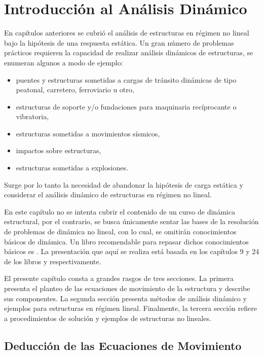 \chapter{Introducción al Análisis Dinámico}\label{cap4DIN}

En capítulos anteriores se cubrió el análisis de estructuras en régimen no lineal bajo la hipótesis de una respuesta estática. Un gran número de problemas prácticos requieren la capacidad de realizar análisis dinámicos de estructuras, se enumeran algunos a modo de ejemplo:
%
\begin{itemize}
	\item puentes y estructuras sometidas a cargas de tránsito dinámicas de tipo peatonal, carretero, ferroviario u otro,
	\item estructuras de soporte y/o fundaciones para maquinaria recíprocante o vibratoria,
	\item estructuras sometidas a movimientos sísmicos,
	\item impactos sobre estructuras,
	\item estructuras sometidas a explosiones.
\end{itemize}
%
Surge por lo tanto la necesidad de abandonar la hipótesis de carga estática y considerar el análisis dinámico de estructuras en régimen no lineal.

En este capítulo no se intenta cubrir el contenido de un curso de dinámica estructural, por el contrario, se busca únicamente sentar las bases de la resolución de problemas de dinámica no lineal, con lo cual, se omitirán conocimientos básicos de dinámica. %
%
Un libro recomendable para repasar dichos conocimientos básicos es \citep{clough1993dynamics}. %
%
La presentación que aquí se realiza está basada en los capítulos 9 y 24 de los libros \citep{Bathe2014} y \citep{Crisfield1997} respectivamente.

El presente capítulo consta a grandes rasgos de tres secciones. La primera presenta el planteo de las ecuaciones de movimiento de la estructura y describe sus componentes. La segunda sección presenta métodos de análisis dinámico y ejemplos para estructuras en régimen lineal. Finalmente, la tercera sección refiere a procedimientos de solución y ejemplos de estructuras no lineales.

\section{Deducción de las Ecuaciones de Movimiento}\label{EcMov}

